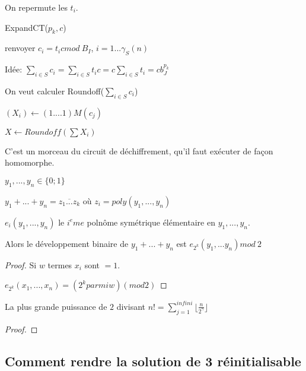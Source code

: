 On repermute les $t_i$.

ExpandCT($p_k,c$)

renvoyer $c_i=t_i c mod \ B_I$, $i=1... \gamma_S(n)$

Idée: $\sum_{i \in S} c_i = \sum_{i \in S} t_i c= c \sum_{i \in S} t_i=c b_J^{p_k}$

On veut calculer Roundoff($\sum_{i \in S} c_i$)

$(X_i) \leftarrow (1....1)M(c_j)$

$X \leftarrow Roundoff(\sum X_i)$

C'est un morceau du circuit de déchiffrement, qu'il faut exécuter de façon homomorphe.

$y_1,...,y_n \in \{0;1\}$

$y_1+...+y_n=\overline{z_1...z_k}$ où $z_i=poly(y_1,...,y_n)$

\begin{lemma}
$e_i(y_1,...,y_n)$ le $i^eme$ polnôme symétrique élémentaire en $y_1,...,y_n$.

Alors le développement binaire de $y_1+...+y_n$ est $e_{2^k} (y_1,...y_n) mod \ 2$
\end{lemma}

\begin{proof}
Si $w$ termes $x_i$ sont $=1$.

$e_{2^k}(x_1,...,x_n)=(2^k parmi w) (mod 2)$
\end{proof}

\begin{lemma}
La plus grande puissance de $2$ divisant $n!= \sum_{j=1}^{infini} \lfloor \frac{n}{2 ^{\gamma}} \rfloor$
\end{lemma}

\begin{proof}
\end{proof}

\subsection{Comment rendre la solution de 3 réinitialisable}
